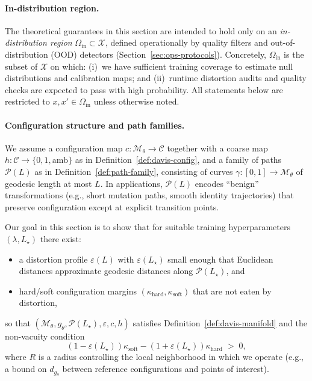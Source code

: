 \documentclass[11pt]{article}
\theoremstyle{remark}
\theoremstyle{plain}
\begin{document}
\paragraph{In-distribution region.}
The theoretical guarantees in this section are intended to hold only on an
\emph{in-distribution region} $\Omega_{\mathrm{in}} \subset \mathcal{X}$, defined operationally by
quality filters and out-of-distribution (OOD) detectors (Section~\ref{sec:ops-protocols}).
Concretely, $\Omega_{\mathrm{in}}$ is the subset of $\mathcal{X}$ on which:
(i)~we have sufficient training coverage to estimate null distributions and calibration maps; and
(ii)~runtime distortion audits and quality checks are expected to pass with high probability.
All statements below are restricted to $x,x' \in \Omega_{\mathrm{in}}$ unless otherwise noted.

\paragraph{Configuration structure and path families.}
We assume a configuration map $c : \mathcal{M}_\theta \to \mathcal{C}$ together with a coarse map
$h : \mathcal{C} \to \{0,1,\mathrm{amb}\}$ as in Definition~\ref{def:davis-config}, and a family of
paths $\mathcal{P}(L)$ as in Definition~\ref{def:path-family}, consisting of curves
$\gamma : [0,1] \to \mathcal{M}_\theta$ of geodesic length at most $L$. In applications,
$\mathcal{P}(L)$ encodes ``benign'' transformations (e.g., short mutation paths, smooth identity
trajectories) that preserve configuration except at explicit transition points.

Our goal in this section is to show that for suitable training hyperparameters $(\lambda, L_\star)$
there exist:
\begin{itemize}
  \item a distortion profile $\varepsilon(L)$ with $\varepsilon(L_\star)$ small enough that
    Euclidean distances approximate geodesic distances along $\mathcal{P}(L_\star)$, and
  \item hard/soft configuration margins $(\kappa_{\mathrm{hard}},\kappa_{\mathrm{soft}})$ that are not
    eaten by distortion,
\end{itemize}
so that $(\mathcal{M}_\theta, g_\theta, \mathcal{P}(L_\star), \varepsilon, c, h)$ satisfies
Definition~\ref{def:davis-manifold} and the non-vacuity condition
\begin{equation}
\label{eq:non-vacuity}
(1-\varepsilon(L_\star))\kappa_{\mathrm{soft}} - (1+\varepsilon(L_\star))\kappa_{\mathrm{hard}} \;>\; 0,
\end{equation}
where $R$ is a radius controlling the local neighborhood in which we operate
(e.g., a bound on $d_{g_\theta}$ between reference configurations and points of interest).
\end{document}
